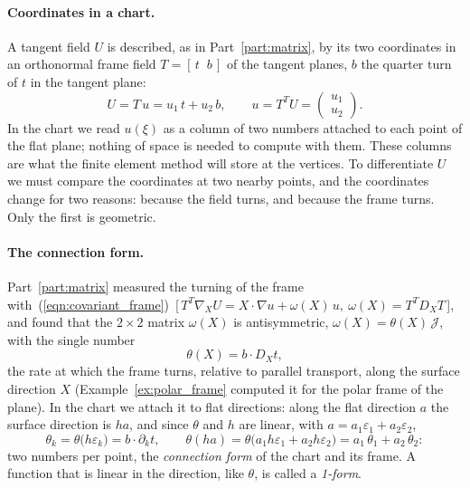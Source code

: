 \paragraph{Coordinates in a chart.} A tangent field $U$ is described, as in Part~\ref{part:matrix}, by its two coordinates in an orthonormal frame field $T = [\,t \;\; b\,]$ of the tangent planes, $b$ the quarter turn of $t$ in the tangent plane:
\begin{equation*}
U = T\,u = u_1\, t + u_2\, b, \qquad u = T^TU = \begin{pmatrix} u_1 \\ u_2 \end{pmatrix} .
\end{equation*}
In the chart we read $u(\xi)$ as a column of two numbers attached to each point of the flat plane; nothing of space is needed to compute with them. These columns are what the finite element method will store at the vertices. To differentiate $U$ we must compare the coordinates at two nearby points, and the coordinates change for two reasons: because the field turns, and because the frame turns. Only the first is geometric.

\paragraph{The connection form.} Part~\ref{part:matrix} measured the turning of the frame with~(\ref{eqn:covariant_frame})~[\,$T^T\nabla_XU = X\cdot\nabla u + \omega(X)\,u,\ \omega(X) = T^TD_XT$\,], and found that the $2\times 2$ matrix $\omega(X)$ is antisymmetric, $\omega(X) = \theta(X)\,\mathcal J$, with the single number
\begin{equation*}
\theta(X) = b\cdot D_X t ,
\end{equation*}
the rate at which the frame turns, relative to parallel transport, along the surface direction $X$ (Example~\ref{ex:polar_frame} computed it for the polar frame of the plane). In the chart we attach it to flat directions: along the flat direction $a$ the surface direction is $ha$, and since $\theta$ and $h$ are linear, with $a = a_1\varepsilon_1 + a_2\varepsilon_2$,
\begin{equation}
\label{eqn:r3_Omega}
\theta_k = \theta\big(h\varepsilon_k\big) = b\cdot\partial_k t, \qquad \theta(ha) = \theta\big(a_1 h\varepsilon_1 + a_2 h\varepsilon_2\big) = a_1\,\theta_1 + a_2\,\theta_2 :
\end{equation}
two numbers per point, the \emph{connection form} of the chart and its frame. A function that is linear in the direction, like $\theta$, is called a \emph{1-form}.

